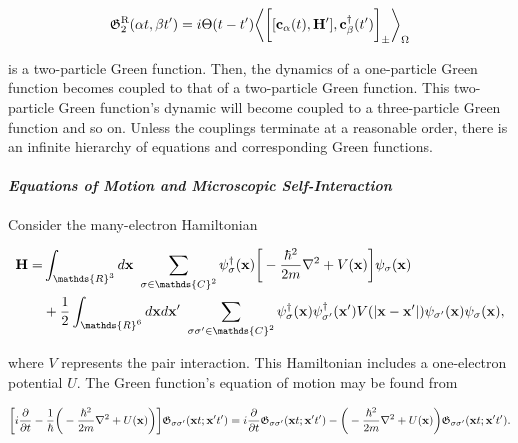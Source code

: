 $$
\mathfrak{G}^{\textnormal{R}}_{2}(\alpha t, \beta t') = i \Theta(t-t') \bigg\langle\bigg[[{\bf c}_{\alpha}(t), {\bf H'}], {\bf c}_{\beta}^\dagger(t') \bigg]_{\pm}\bigg\rangle_{\Omega}
$$

is a two-particle Green function. Then, the dynamics of a one-particle Green function becomes coupled to that of a two-particle Green function. This two-particle Green function's dynamic will become coupled to a three-particle Green function and so on. Unless the couplings terminate at a reasonable order, there is an infinite hierarchy of equations and corresponding Green functions. \\

\paragraph{\textit{Equations of Motion and Microscopic Self-Interaction}}

Consider the many-electron Hamiltonian

\begin{equation}\begin{split}
    {\bf H} = &\int_{\mathds{R}^3} d{\bf x} \blanky \sum_{\sigma \in \mathds{C}^2} \psi^\dagger_{\sigma}({\bf x}) \bigg[-\frac{\hbar^2}{2m} \nabla^2 + V({\bf x})\bigg]\psi_{\sigma}({\bf x}) \\
    & + \frac{1}{2}  \int_{\mathds{R}^6} d{\bf x} d{\bf x}' \blanky \sum_{\sigma \sigma' \in \mathds{C}^2} \psi^\dagger_{\sigma}({\bf x}) \psi^\dagger_{\sigma'}({\bf x}') V(|{\bf x} - {\bf x}'|) \psi_{\sigma'}({\bf x}) \psi_{\sigma}({\bf x}),
\end{split}\end{equation}

where $V$ represents the pair interaction. This Hamiltonian includes a one-electron potential $U$. The Green function's equation of motion may be found from

\begin{equation}
    \begin{split}
        \bigg[i\frac{\partial}{\partial t} - \frac{1}{\hbar} \bigg(-\frac{\hbar^2}{2m} \nabla^2 + U({\bf x})\bigg)\bigg] \mathfrak{G}_{\sigma \sigma'}({\bf x} t; {\bf x}' t') = i\frac{\partial}{\partial t} \mathfrak{G}_{\sigma \sigma'}({\bf x} t; {\bf x}' t') - \bigg(-\frac{\hbar^2}{2m} \nabla^2 + U({\bf x})\bigg) \mathfrak{G}_{\sigma \sigma'}({\bf x} t; {\bf x}' t').
    \end{split}
\end{equation}

